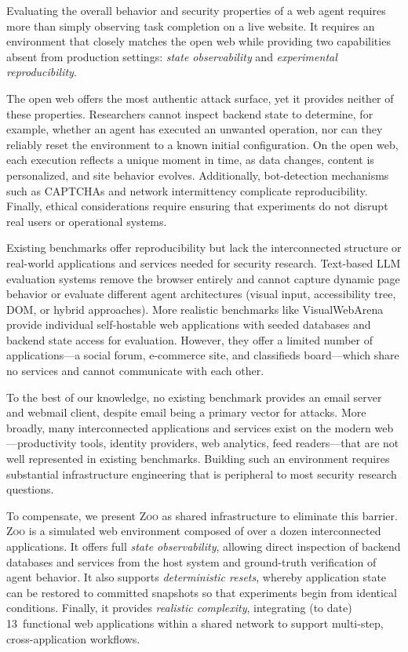 \documentclass{article} %
\newcommand{\zoo}{\textsc{Zoo}}
\begin{document}
Evaluating the overall behavior and security properties of a web agent requires more than simply observing task completion on a live website.
It requires an environment that closely matches the open web while providing two capabilities absent from production settings: \textit{state observability} and \textit{experimental reproducibility}.

The open web offers the most authentic attack surface, yet it provides neither of these properties.
Researchers cannot inspect backend state to determine, for example, whether an agent has executed an unwanted operation, nor can they reliably reset the environment to a known initial configuration.
On the open web, each execution reflects a unique moment in time, as data changes, content is personalized, and site behavior evolves.
Additionally, bot-detection mechanisms such as CAPTCHAs and network intermittency complicate reproducibility.
Finally, ethical considerations require ensuring that experiments do not disrupt real users or operational systems.

Existing benchmarks offer reproducibility but lack the interconnected structure or real-world applications and services needed for security research.
Text-based LLM evaluation systems remove the browser entirely and cannot capture dynamic page behavior or evaluate different agent architectures (visual input, accessibility tree, DOM, or hybrid approaches).
More realistic benchmarks like VisualWebArena \citep{visualwebarena} provide individual self-hostable web applications with seeded databases and backend state access for evaluation.
However, they offer a limited number of applications---a social forum, e-commerce site, and classifieds board---which share no services and cannot communicate with each other.

To the best of our knowledge, no existing benchmark provides an email server and webmail client, despite email being a primary vector for attacks.
More broadly, many interconnected applications and services exist on the modern web---productivity tools, identity providers, web analytics, feed readers---that are not well represented in existing benchmarks.
Building such an environment requires substantial infrastructure engineering that is peripheral to most security research questions.

To compensate, we present \zoo{} as shared infrastructure to eliminate this barrier.
\zoo{} is a simulated web environment composed of over a dozen interconnected applications.
It offers full \textit{state observability}, allowing direct inspection of backend databases and services from the host system and ground-truth verification of agent behavior.
It also supports \textit{deterministic resets}, whereby application state can be restored to committed snapshots so that experiments begin from identical conditions.
Finally, it provides \textit{realistic complexity}, integrating (to date) 13~functional web applications within a shared network to support multi-step, cross-application workflows.
\end{document}
